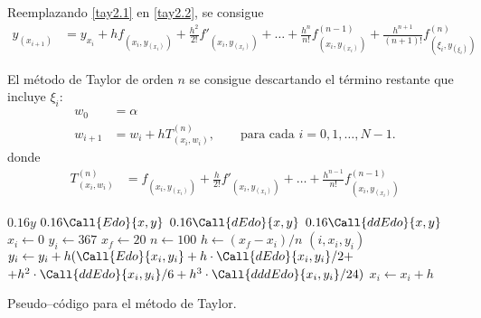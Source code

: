 \documentclass[english,spanish,Ce-table,Ce-theorem]{CabesHW}
\begin{document}
Reemplazando \eqref{tay2.1} en \eqref{tay2.2}, se consigue
\begin{align*}
    y_{(x_{i+1})} &= y_{x_i} + hf_{(x_i, y_{(x_i)})} + \frac{h^2}{2!}f'_{(x_i, y_{(x_i)})} + \ldots + \frac{h^{n}}{n!}f^{(n-1)}_{(x_i, y_{(x_i)})} + \frac{h^{n+1}}{(n+1)!}f^{(n)}_{(\xi_i, y_{(\xi_i)})}
\end{align*}

El método de Taylor de orden $n$ se consigue descartando el término restante que incluye $\xi_i$:
\begin{align*}
    w_0 &= \alpha\\
    w_{i+1} &= w_i + hT^{(n)}_{(x_i, w_i)}, \qquad \text{para cada $i = 0, 1, \ldots, N-1$}.
\end{align*}
donde
\begin{align*}
    T^{(n)}_{(x_i, w_i)} &= f_{(x_i, y_{(x_i)})} + \frac{h}{2!}f'_{(x_i, y_{(x_i)})} + \ldots + \frac{h^{n-1}}{n!}f^{(n-1)}_{(x_i, y_{(x_i)})} 
\end{align*}


\begin{algorithm}[H]
    \centering
    \begin{myalg}[1]
     
        \State \Output $0.16 y$
    \EndFunction
    \State \phantom{}
     
        \State \Output $0.16 \Call{Edo}{x,y}$
    \EndFunction
    \State \phantom{}
     
        \State \Output $0.16 \Call{dEdo}{x,y}$
    \EndFunction
    \State \phantom{}
     
        \State \Output $0.16 \Call{ddEdo}{x,y}$
    \EndFunction
    \State \phantom{}
    \State $x_i \gets 0$ 
    \State $y_i \gets 367$ 
    \State $x_f \gets 20$ 
    \State $n \gets 100$ 
    \State \phantom{}
    \State $h \gets (x_f - x_i)/n$ 
        \State \Output $(i, x_i, y_i)$
        \State \phantom{}
        \State $y_i \gets y_i + h(\Call{Edo}{x_i, y_i} + h\cdot\Call{dEdo}{x_i, y_i}/2 + $
        \Statex \hspace{5em}$+ h^2\cdot\Call{ddEdo}{x_i, y_i}/6 + h^3\cdot\Call{dddEdo}{x_i, y_i}/24)$
        \State $x_i \gets x_i + h$
    \EndFor
    \end{myalg}
    \caption{Pseudo--código para el método de Taylor.}
    \label{alg:taylor}
\end{algorithm}
\end{document}
